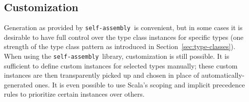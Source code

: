 \documentclass[preprint,nocopyrightspace]{sigplanconf}
\newcommand{\selfassembly}{\texttt{self-assembly~}}
\begin{document}







\subsection{Customization}
\label{sec:customization}

Generation as provided by \selfassembly is convenient, but in some cases it is desirable
to have full control over the type class instances for specific types (one strength of the
type class pattern as introduced in Section~\ref{sec:type-classes}). When using the
\selfassembly library, customization is still possible. It is sufficient to define
custom instances for selected types manually; these custom instances are then transparently
picked up and chosen in place of automatically-generated ones. It is even possible to
use Scala's scoping and implicit precedence rules to prioritize certain instances over
others.
\end{document}
